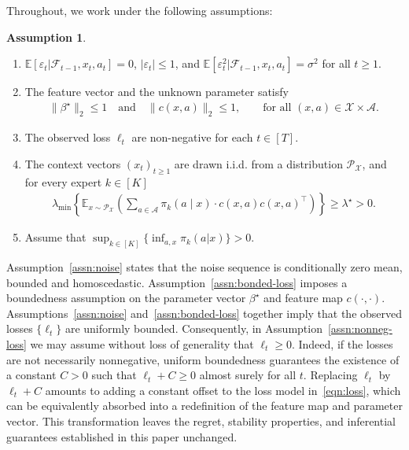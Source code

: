 \documentclass[11pt,letterpaper]{article}
\newcommand{\loss}{\ell}
\theoremstyle{plain}
\theoremstyle{definition}  %
\newtheorem{assumption}{Assumption}
\begin{document}
\noindent Throughout, we work under the following assumptions:
%
\begin{assumption}
\leavevmode
\begin{enumerate}[label=(A\arabic*), leftmargin=2.5em]
  \item \label{assn:noise} $\mathbb{E}[\varepsilon_t|\mathcal{F}_{t -1}, x_t,a_t] = 0$, $|\varepsilon_t| \leq 1$,  and 
  $\mathbb{E}[\varepsilon^2_t|\mathcal{F}_{t -1}, x_t,a_t] = \sigma^2$
     for all $t \geq 1$.
  \item    \label{assn:bonded-loss} The feature vector and the unknown parameter satisfy 
  \begin{align*}
      \|\beta^\star\|_2 \leq 1 \quad \text{and} \quad  \|c(x, a)\|_2 \leq 1, 
      \qquad  \text{for all } (x, a) \in \mathcal{X} \times \mathcal{A}. 
  \end{align*}
    \item \label{assn:nonneg-loss} The observed loss  $\loss_t$ are non-negative for each $t \in [T]$.
    \item \label{assn:context} The context vectors $(x_t)_{t\geq1}$ are drawn i.i.d. from a distribution $\mathcal{P_X}$, and for every expert $k \in [K]$
    \begin{align}
    \label{eqn:min-eigval}
    \lambda_{\min} \left\lbrace \mathbb{E}_{x \sim \mathcal{P_X}} \left( \sum_{a \in \mathcal{A}} \pi_k(a \mid x) \cdot c(x, a) c(x, a)^\top \right) \right\rbrace  \geq \lambda^\star > 0. 
    \end{align}
    \item Assume that \label{assn:Q-bdd} $ \sup_{k \in [K]}\{\inf_{a,x}\pi_k(a|x)\} > 0$.
\end{enumerate}
\end{assumption}
%
Assumption~\ref{assn:noise} states that the noise sequence is conditionally zero mean, bounded and homoscedastic. Assumption~\ref{assn:bonded-loss} imposes a boundedness assumption on the parameter vector $\beta^\star$ and feature map $c(\cdot, \cdot)$. Assumptions~\ref{assn:noise} and~\ref{assn:bonded-loss} together imply that the observed losses 
$\{\loss_t\}$ are uniformly bounded. Consequently, in Assumption~\ref{assn:nonneg-loss} we may 
assume without loss of generality that $\loss_t \ge 0$. 
Indeed, if the losses are not necessarily nonnegative, uniform boundedness guarantees the existence of a constant $C > 0$ such that $\loss_t + C \ge 0$ almost surely for all $t$. Replacing $\loss_t$ by $\loss_t + C$ amounts to adding a constant offset to the loss model in~\eqref{eqn:loss}, which can be equivalently absorbed into a redefinition of the feature map and parameter vector. This transformation leaves the regret, stability properties, and inferential guarantees established in this paper unchanged.
\end{document}
